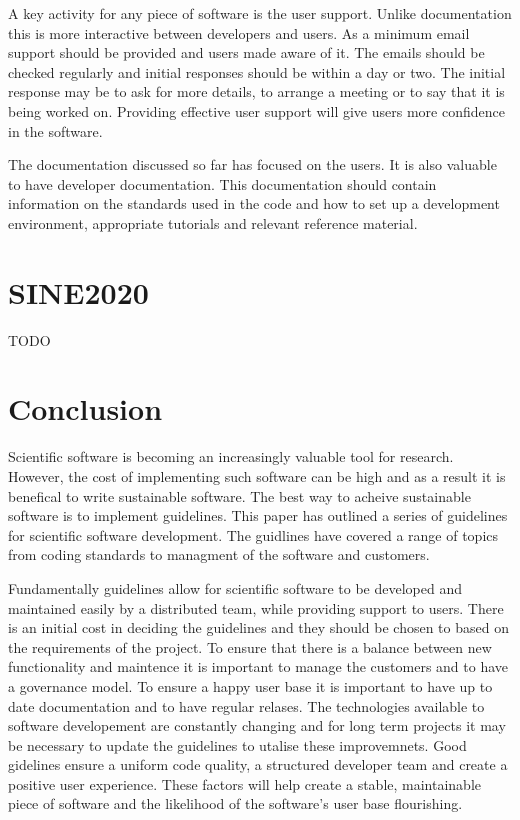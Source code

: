 \documentclass[jnr]{iosart2x}
\begin{document}
A key activity for any piece of software is the user support.
Unlike documentation this is more interactive between developers and users.
As a minimum email support should be provided and users made aware of it.
The emails should be checked regularly and initial responses should be within a day or two.
The initial response may be to ask for more details, to arrange a meeting or to say that it is being worked on.
Providing effective user support will give users more confidence in the software.

The documentation discussed so far has focused on the users.
It is also valuable to have developer documentation.
This documentation should contain information on the standards used in the code and how to set up a development environment, appropriate tutorials and relevant reference material.

\section{SINE2020}
\label{SINE2020}

TODO

\section{Conclusion}
\label{Conclusion}

Scientific software is becoming an increasingly valuable tool for research.
However, the cost of implementing such software can be high and as a result it is benefical to write sustainable software.
The best way to acheive sustainable software is to implement guidelines.
This paper has outlined a series of guidelines for scientific software development.
The guidlines have covered a range of topics from coding standards to managment of the software and customers.

Fundamentally guidelines allow for scientific software to be developed and maintained easily by a distributed team, while providing support to users.
There is an initial cost in deciding the guidelines and they should be chosen to based on the requirements of the project.
To ensure that there is a balance between new functionality and maintence it is important to manage the customers and to have a governance model.
To ensure a happy user base it is important to have up to date documentation and to have regular relases.
The technologies available to software developement are constantly changing and for long term projects it may be necessary to update the guidelines to utalise these improvemnets.
Good gidelines ensure a uniform code quality, a structured developer team and create a positive user experience.
These factors will help create a stable, maintainable piece of software and the likelihood of the software's user base flourishing.
\end{document}
